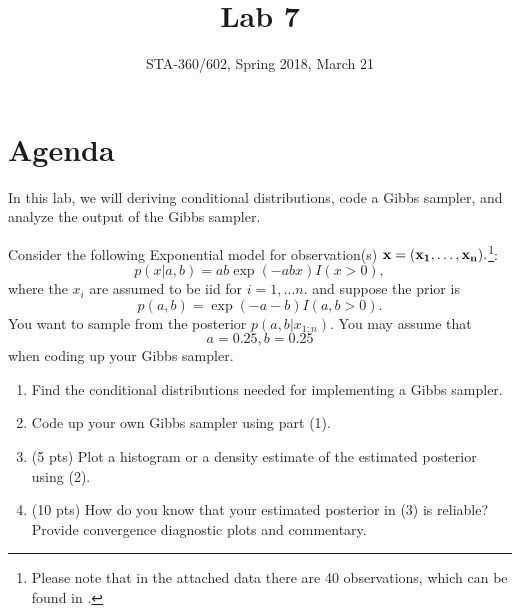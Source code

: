\documentclass{article}
\begin{document}
\title{Lab 7}
\author{STA-360/602, Spring 2018, March 21}
\maketitle

\section{Agenda}

In this lab, we will deriving conditional distributions, code a Gibbs sampler, and analyze the output of the Gibbs sampler. 

Consider the following Exponential model for observation(s) $\bf{x}=(x_1,\ldots,x_n).$\footnote{Please note that in the attached data there are 40 observations, which can be found in .}:
$$ p(x|a,b) = a b \exp(- a b x) I(x>0),$$ where the $x_i$ are assumed to be iid for $i=1,\ldots n.$
and suppose the prior is 
$$ p(a,b) = \exp(- a - b)I(a,b>0). $$
You want to sample from the posterior $p(a,b|x_{1:n})$.  You may assume that $$a=0.25, b=0.25$$ when coding up your Gibbs sampler.

\begin{enumerate}
\item Find the conditional distributions needed for implementing a Gibbs sampler.
\item Code up your own Gibbs sampler using part (1).
\item (5 pts) Plot a histogram or a density estimate of the estimated posterior using (2). 
\item (10 pts) How do you know that your estimated posterior in (3) is reliable? Provide convergence diagnostic plots and commentary. 
\end{enumerate}
\end{document}
